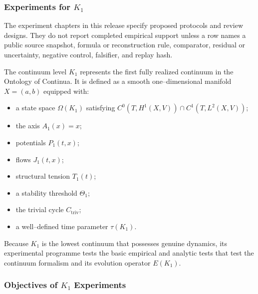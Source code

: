 
\subsubsection{Experiments for \texorpdfstring{$K_1$}{K_1}}

The experiment chapters in this release specify proposed protocols and review designs. They do not report completed empirical support unless a row names a public source snapshot, formula or reconstruction rule, comparator, residual or uncertainty, negative control, falsifier, and replay hash.
\label{sec:experiments-k1}

The continuum level $K_1$ represents the first fully realized continuum in
the Ontology of Continua.
It is defined as a smooth one–dimensional manifold $X = (a,b)$ equipped with:
\begin{itemize}
    \item a state space $\Omega(K_1)$ satisfying
          $C^0(T,H^1(X,V))\cap C^1(T,L^2(X,V))$;
    \item the axis $A_1(x)=x$;
    \item potentials $P_1(t,x)$;
    \item flows $J_1(t,x)$;
    \item structural tension $T_1(t)$;
    \item a stability threshold $\Theta_1$;
    \item the trivial cycle $C_{\mathrm{triv}}$;
    \item a well–defined time parameter $\tau(K_1)$.
\end{itemize}

Because $K_1$ is the lowest continuum that possesses genuine dynamics,
its experimental programme tests the basic empirical and analytic
tests that test the continuum formalism and its evolution operator
$E(K_1)$.


\subsubsection{Objectives of \texorpdfstring{$K_1$}{K_1} Experiments}

